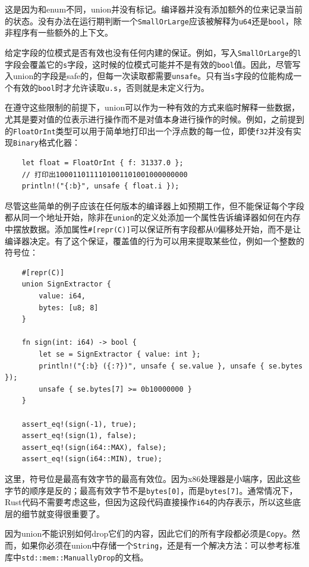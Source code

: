 这是因为和enum不同，union并没有标记。编译器并没有添加额外的位来记录当前的状态。没有办法在运行期判断一个\texttt{SmallOrLarge}应该被解释为\texttt{u64}还是\texttt{bool}，除非程序有一些额外的上下文。

给定字段的位模式是否有效也没有任何内建的保证。例如，写入\texttt{SmallOrLarge}的\texttt{l}字段会覆盖它的\texttt{s}字段，这时候的位模式可能并不是有效的\texttt{bool}值。因此，尽管写入union的字段是safe的，但每一次读取都需要\texttt{unsafe}。只有当\texttt{s}字段的位能构成一个有效的\texttt{bool}时才允许读取\texttt{u.s}，否则就是未定义行为。

在遵守这些限制的前提下，union可以作为一种有效的方式来临时解释一些数据，尤其是要对值的位表示进行操作而不是对值本身进行操作的时候。例如，之前提到的\texttt{FloatOrInt}类型可以用于简单地打印出一个浮点数的每一位，即使\texttt{f32}并没有实现\texttt{Binary}格式化器：
\begin{verbatim}
    let float = FloatOrInt { f: 31337.0 };
    // 打印出1000110111101001101001000000000
    println!("{:b}", unsafe { float.i });
\end{verbatim}

尽管这些简单的例子应该在任何版本的编译器上如预期工作，但不能保证每个字段都从同一个地址开始，除非在\texttt{union}的定义处添加一个属性告诉编译器如何在内存中摆放数据。添加属性\texttt{\#[repr(C)]}可以保证所有字段都从0偏移处开始，而不是让编译器决定。有了这个保证，覆盖值的行为可以用来提取某些位，例如一个整数的符号位：
\begin{verbatim}
    #[repr(C)]
    union SignExtractor {
        value: i64,
        bytes: [u8; 8]
    }

    fn sign(int: i64) -> bool {
        let se = SignExtractor { value: int };
        println!("{:b} ({:?})", unsafe { se.value }, unsafe { se.bytes });
        unsafe { se.bytes[7] >= 0b10000000 }
    }

    assert_eq!(sign(-1), true);
    assert_eq!(sign(1), false);
    assert_eq!(sign(i64::MAX), false);
    assert_eq!(sign(i64::MIN), true);
\end{verbatim}

这里，符号位是最高有效字节的最高有效位。因为x86处理器是小端序，因此这些字节的顺序是反的；最高有效字节不是\texttt{bytes[0]}，而是\texttt{bytes[7]}。通常情况下，Rust代码不需要考虑这些，但因为这段代码直接操作\texttt{i64}的内存表示，所以这些底层的细节就变得很重要了。

因为union不能识别如何drop它们的内容，因此它们的所有字段都必须是\texttt{Copy}。然而，如果你必须在union中存储一个\texttt{String}，还是有一个解决方法：可以参考标准库中\texttt{std::mem::ManuallyDrop}的文档。

